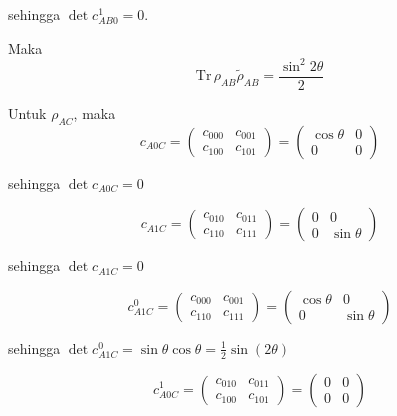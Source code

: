 sehingga $\det c_{AB0}^1 = 0$.

Maka
\begin{equation}
	\mathrm{Tr}\,\rho_{AB}\tilde{\rho}_{AB}=\frac{\sin^2 2\theta}{2}	
\end{equation}

Untuk $\rho_{AC}$, maka
\begin{equation}
	c_{A0C}=
	\begin{pmatrix}
		c_{000} & c_{001} \\
		c_{100} & c_{101}
	\end{pmatrix}=
	\begin{pmatrix}
		\cos\theta & 0 \\
		0 & 0
	\end{pmatrix}
\end{equation}

sehingga $\det c_{A0C} = 0$

\begin{equation}
	c_{A1C}=
	\begin{pmatrix}
		c_{010} & c_{011} \\
		c_{110} & c_{111}
	\end{pmatrix}=
	\begin{pmatrix}
		0 & 0 \\
		0 & \sin\theta
	\end{pmatrix}
\end{equation}

sehingga $\det c_{A1C} = 0$

\begin{equation}
	c_{A1C}^0=
	\begin{pmatrix}
		c_{000} & c_{001} \\
		c_{110} & c_{111}
	\end{pmatrix}=
	\begin{pmatrix}
		\cos\theta & 0 \\
		0 & \sin\theta
	\end{pmatrix}
\end{equation}

sehingga $\det c_{A1C}^0 = \sin\theta \cos\theta = \frac{1}{2}\sin(2\theta)$

\begin{equation}
	c_{A0C}^1=
	\begin{pmatrix}
		c_{010} & c_{011} \\
		c_{100} & c_{101}
	\end{pmatrix}=
	\begin{pmatrix}
		0 & 0 \\
		0 & 0
	\end{pmatrix}
\end{equation}

